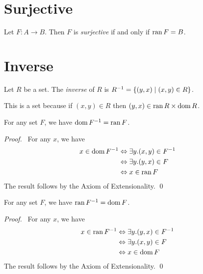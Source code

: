 \section{Surjective}

\begin{definition}[Surjective]
    Let $F : A \rightarrow B$. Then $F$ is \emph{surjective} if and only if
    $\operatorname{ran} F = B$.
\end{definition}

\section{Inverse}

\begin{definition}
    Let $R$ be a set. The \emph{inverse} of $R$ is ${R}^{-1} = \{ (y,x) \mid (x,y) \in R \}$.

    This is a set because if $(x,y) \in R$ then $(y,x) \in \operatorname{ran} R \times \operatorname{dom} R$.
\end{definition}

\begin{theorem}
    \label{theorem:dom_inv}
    For any set $F$, we have $\operatorname{dom} {F}^{-1} = \operatorname{ran} F$.
\end{theorem}

\begin{proof}
    \pf\ For any $x$, we have
    \begin{align*}
        x \in \operatorname{dom} {F}^{-1} & \Leftrightarrow \exists y. (x,y) \in {F}^{-1} \\
        & \Leftrightarrow \exists y. (y,x) \in F \\
        & \Leftrightarrow x \in \operatorname{ran} F
    \end{align*}
    The result follows by the Axiom of Extensionality. \qed
\end{proof}

\begin{theorem}
    \label{theorem:ran_inv}
    For any set $F$, we have $\operatorname{ran} {F}^{-1} = \operatorname{dom} F$.
\end{theorem}

\begin{proof}
    \pf\ For any $x$, we have
    \begin{align*}
        x \in \operatorname{ran} {F}^{-1} & \Leftrightarrow \exists y. (y,x) \in {F}^{-1} \\
        & \Leftrightarrow \exists y. (x,y) \in F \\
        & \Leftrightarrow x \in \operatorname{dom} F
    \end{align*}
    The result follows by the Axiom of Extensionality. \qed
\end{proof}


